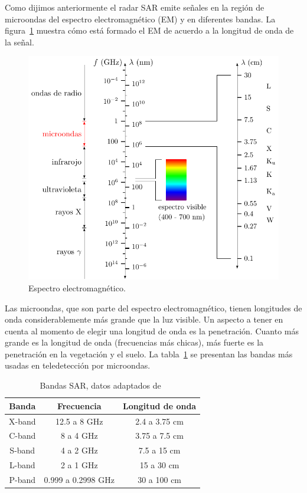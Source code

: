 Como dijimos anteriormente el radar SAR emite señales en la región de microondas del espectro electromagnético (EM) y en diferentes bandas. La figura~\ref{Espectro} muestra cómo está formado el EM de acuerdo a la longitud de onda de la señal.

\begin{figure}[hbt]
	\centering    
	\includegraphics[scale=1]{../../Figures/Tesis/Capitulo3/EEM.pdf}
	\caption{\label{Espectro}Espectro electromagnético.}
\end{figure}

Las microondas, que son parte del espectro electromagnético, tienen longitudes de onda considerablemente más grande que la luz visible. Un aspecto a tener en cuenta al momento de elegir una longitud de onda es la penetración. Cuanto más grande es la longitud de onda (frecuencias más chicas), más fuerte es la penetración en la vegetación y el suelo. La tabla~\ref{Bandas} se presentan las bandas más usadas en teledetección por microondas.

\begin{table}[H]
	\centering
	\begin{tabular}{ccc}
		\toprule
		\textbf{Banda}	& \textbf{Frecuencia}		    	& \textbf{Longitud de onda} \\ \midrule
		X-band			& 12.5 a 8 \si{\giga\hertz}         &  2.4 a 3.75 \si{\centi\meter} \\
		C-band			&  8 a 4 \si{\giga\hertz} 			&  3.75 a 7.5 \si{\centi\meter}\\
		S-band			&  4 a 2 \si{\giga\hertz} 	        &  7.5 a 15 \si{\centi\meter} \\
		L-band			&  2 a 1 \si{\giga\hertz} 	        &  15 a 30 \si{\centi\meter} \\
		P-band			&  0.999 a 0.2998 \si{\giga\hertz} 	&  30 a 100 \si{\centi\meter} \\
		\bottomrule
	\end{tabular}
	\caption{\label{Bandas}Bandas SAR, datos adaptados de~\citet{Sarmap2009}}
\end{table}

